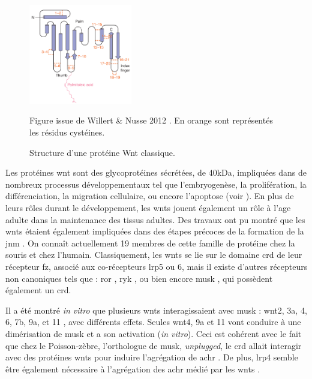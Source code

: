 	\begin{figure}
		\includegraphics[width=0.4\textwidth]{./Images/WntProtein.png}	
		\caption{Structure d'une protéine Wnt classique.}{Figure issue de Willert \& Nusse 2012 \cite{Willert2012}. En orange sont représentés les résidus cystéines.}
		\label{fig:WntProt}
	\end{figure}
	
	Les protéines \gls{wnt} sont des glycoprotéines sécrétées, de 40kDa, impliquées dans de nombreux processus développementaux tel que l'embryogenèse, la prolifération, la différenciation, la migration cellulaire, ou encore l'apoptose \cite{Miller2002, Willert2012} (voir ). En plus de leurs rôles durant le développement, les \Glspl{wnt} jouent également un rôle à l'age adulte dans la maintenance des tissus adultes. Des travaux ont pu montré que les \Glspl{wnt} étaient également impliquées dans des étapes précoces de la formation de la \gls{jnm} \cite{Hall2000}. On connaît actuellement 19 membres de cette famille de protéine chez la souris et chez l'humain. Classiquement, les \Glspl{wnt} se lie sur le domaine \gls{crd} de leur récepteur \gls{fz}, associé aux co-récepteurs \gls{lrp}5 ou 6, mais il existe d'autres récepteurs non canoniques tels que : \acrshort{ror} \cite{Cadigan2006, Gordon2006, Green2008}, \acrshort{ryk} \cite{Bovolenta2006, Fradkin2010}, ou bien encore \gls{musk} \cite{Jing2009}, qui possèdent également un \gls{crd}.
	
	Il a été montré \emph{in vitro} que plusieurs \Glspl{wnt} interagissaient avec \gls{musk} : \Gls{wnt}2, 3a, 4, 6, 7b, 9a, et 11 \cite{Strochlic2012, Zhang2012, Barik2014}, avec différents effets. Seules \gls{wnt}4, 9a et 11 vont conduire à une dimérisation de \gls{musk} et a son activation (\emph{in vitro}). Ceci est cohérent avec le fait que chez le Poisson-zèbre, l'orthologue de \gls{musk}, \emph{unplugged}, le \gls{crd} allait interagir avec des protéines \Glspl{wnt} pour induire l'agrégation de \gls{achr} \cite{Jing2009, Gordon2012}. De plus, \gls{lrp}4 semble être également nécessaire à l'agrégation des \gls{achr} médié par les \gls{wnt}s \cite{Zhang2012}.
	
